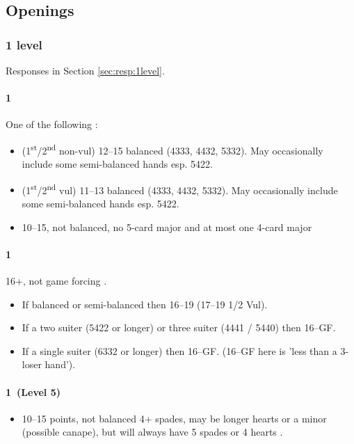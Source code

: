 
\subsection{Openings}
\label{sec:openings}

\subsubsection{1 level}
\label{sec:open:1level}

Responses in Section \ref{sec:resp:1level}.

\paragraph{1\clubs}

One of the following :

\begin{itemize}
\item (1\textsuperscript{st}/2\textsuperscript{nd} non-vul) 12--15 balanced (4333, 4432, 5332). May occasionally include some semi-balanced hands esp. 5422.
\item (1\textsuperscript{st}/2\textsuperscript{nd} vul) 11--13 balanced (4333, 4432, 5332). May occasionally include some semi-balanced hands esp. 5422.

\item 10--15, not balanced, no 5-card major and at most one 4-card major
\end{itemize}

\paragraph{1\diamonds}

16+, not game forcing . 
\begin{itemize}
\item If balanced or semi-balanced then 16--19 (17--19 1/2 Vul). 
\item If a two suiter (5422 or longer) or three suiter (4441 / 5440) then 16--GF. 
\item If a single suiter (6332 or longer) then 16--GF. (16--GF here is 'less than a 3-loser hand').
\end{itemize}

{\it

\paragraph{1\hearts~(Level 5)}

\begin{itemize}
\item 10--15 points, not balanced 4+ spades, may be longer hearts or a minor (possible canape), but will always have 5 spades or 4 hearts .
\end{itemize}

}

